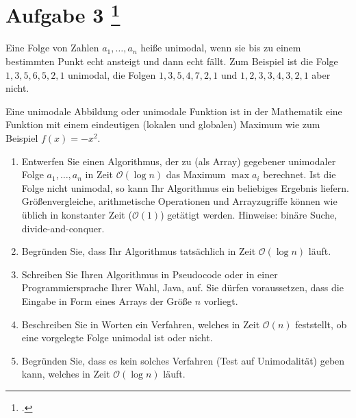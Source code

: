 \documentclass{lehramt-informatik-aufgabe}
\begin{document}
\section{Aufgabe 3
\footcite{46115:2015:09}}

Eine Folge von Zahlen $a_1, \dots, a_n$ heiße unimodal, wenn sie bis zu
einem bestimmten Punkt echt ansteigt und dann echt fällt. Zum Beispiel
ist die Folge $1,3,5,6,5,2,1$ unimodal, die Folgen $1,3,5,4,7,2,1$ und
$1,2,3,3,4,3,2,1$ aber nicht.

\begin{liExkurs}
Eine unimodale Abbildung oder unimodale Funktion ist in der Mathematik
eine Funktion mit einem eindeutigen (lokalen und globalen) Maximum wie
zum Beispiel $f(x)=-x^{2}$.
\end{liExkurs}

\begin{enumerate}


\item Entwerfen Sie einen Algorithmus, der zu (als Array) gegebener
unimodaler Folge $a_1, \dots, a_n$ in Zeit $\mathcal{O}(\log n)$ das
Maximum $\max a_i$ berechnet. Ist die Folge nicht unimodal, so kann Ihr
Algorithmus ein beliebiges Ergebnis liefern. Größenvergleiche,
arithmetische Operationen und Arrayzugriffe können wie üblich in
konstanter Zeit ($\mathcal{O}(1)$) getätigt werden. Hinweise: binäre
Suche, divide-and-conquer.

\begin{liAntwort}
\end{liAntwort}


\item Begründen Sie, dass Ihr Algorithmus tatsächlich in Zeit
$\mathcal{O}(\log n)$ läuft.


\item Schreiben Sie Ihren Algorithmus in Pseudocode oder in einer
Programmiersprache Ihrer Wahl, \zB Java, auf. Sie dürfen voraussetzen,
dass die Eingabe in Form eines Arrays der Größe $n$ vorliegt.


\item Beschreiben Sie in Worten ein Verfahren, welches in Zeit
$\mathcal{O}(n)$ feststellt, ob eine vorgelegte Folge unimodal ist oder
nicht.


\item Begründen Sie, dass es kein solches Verfahren (Test auf
Unimodalität) geben kann, welches in Zeit $\mathcal{O}(\log n)$ läuft.
\end{enumerate}
\end{document}
